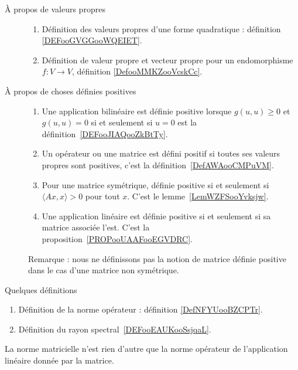         \label{THEMEooYEVLooWotqMY}
\begin{description}
    \item[À propos de valeurs propres]
        \begin{enumerate}
            \item
                Définition des valeurs propres d'une forme quadratique : définition \ref{DEFooGVGGooWQEIET}.
            \item
                Définition de valeur propre et vecteur propre pour un endomorphisme \( f\colon V\to V\), définition \ref{DefooMMKZooVcskCc}.
        \end{enumerate}
    \item[À propos de choses définies positives] 
\begin{enumerate}
    \item
        Une application bilinéaire est définie positive lorsque \( g(u,u)\geq 0\) et \( g(u,u)=0\) si et seulement si \( u=0\) est la définition~\ref{DEFooJIAQooZkBtTy}.
    \item
        Un opérateur ou une matrice est défini positif si toutes ses valeurs propres sont positives, c'est la définition~\ref{DefAWAooCMPuVM}.
    \item
        Pour une matrice symétrique, définie positive si et seulement si \( \langle Ax, x\rangle >0\) pour tout \( x\). C'est le lemme~\ref{LemWZFSooYvksjw}.
    \item
        Une application linéaire est définie positive si et seulement si sa matrice associée l'est. C'est la proposition~\ref{PROPooUAAFooEGVDRC}.
\end{enumerate}
Remarque : nous ne définissons pas la notion de matrice définie positive dans le cas d'une matrice non symétrique.
\end{description}

     \label{THEMEooOJJFooWMSAtL}

Quelques définitions
\begin{enumerate}
    \item
        Définition de la norme opérateur : définition \ref{DefNFYUooBZCPTr}.
    \item
        Définition du rayon spectral~\ref{DEFooEAUKooSsjqaL}.
\end{enumerate}

    La norme matricielle n'est rien d'autre que la norme opérateur de l'application linéaire donnée par la matrice.

